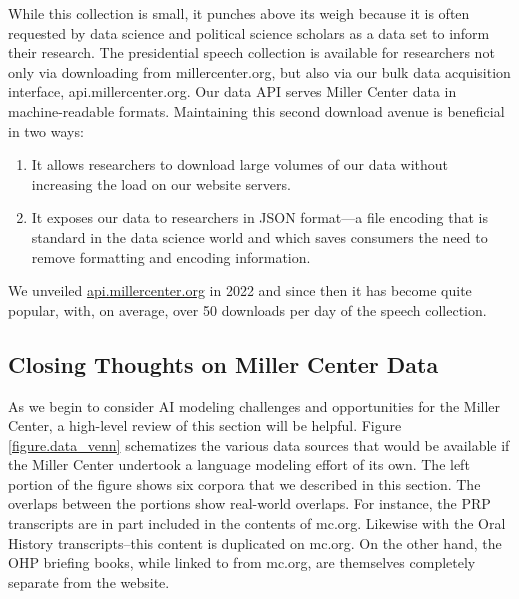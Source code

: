 \documentclass[12pt, oneside]{article}   	%
\begin{document}
While this collection is small, it punches above its weigh because it is often requested by data science and political science scholars as a data set to inform their research.  The presidential speech collection is available for researchers not only via downloading from millercenter.org, but also via our bulk data acquisition interface, api.millercenter.org.  Our data API serves Miller Center data in machine-readable formats.  Maintaining this second download avenue is beneficial in two ways:
\begin{enumerate}
\item It allows researchers to download large volumes of our data without increasing the load on our website servers.
\item It exposes our data to researchers in JSON format—a file encoding that is standard in the data science world and which saves consumers the need to remove formatting and encoding information.
\end{enumerate}
We unveiled \url{api.millercenter.org} in 2022 and since then it has become quite popular, with, on average, over 50 downloads per day of the speech collection.


\subsection{Closing Thoughts on Miller Center Data}\label{section.data.closing}
As we begin to consider AI modeling challenges and opportunities for the Miller Center, a high-level review of this section will be helpful.  Figure \ref{figure.data_venn} schematizes the various data sources that would be available if the Miller Center undertook a language modeling effort of its own.  The left portion of the figure shows six corpora that we described in this section.  The overlaps between the portions show real-world overlaps.  For instance, the PRP transcripts are in part included in the contents of mc.org.  Likewise with the Oral History transcripts--this content is duplicated on mc.org.  On the other hand, the OHP briefing books, while linked to from mc.org, are themselves completely separate from the website.
\end{document}

